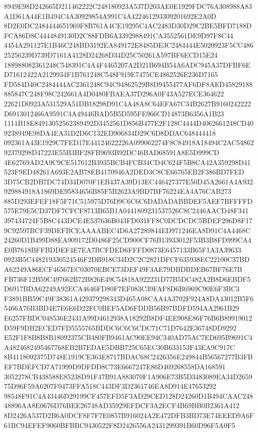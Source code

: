 \documentclass[UTF8,fontset=fandol,zihao=-4,a4paper]{ctexart}
\begin{document}
{{8949E98D242665D211462222C248180923A537D203AE0E1929FDC76A308988A83A1D61A44E1B494C4A30929854A991C4A422461293309201692E2A0D
8D2E0DC2484444651969F8B761A4CE19295C4AC2483D30D29C2BE5BFD7188DFCA86D8C4444849130D2C88FDB6A3392988491CA3552561DE9D97F8C44
4454A291127E1B46C248BD3192EA849172E8485DE3C2484444E5020923F5CC48625256239D739D7161A4128D24268D34D25C50261A597BF6ECD15E24
188988082361248C548391C4A4F4465207A2D21B694B54A6ADC945A37DFBF6ED71612422A2129934F1B761248C548F919E7475CE4862526E236D7165
FD584D40C2484444AC2361248C94C94862529B8D9455477AF6DF8AED45829188885847C248F98C242661A4D0480FBAEA37D296A0F43A527ECE364622
22621D0923A531529A51DB18298D91C4A48A8C64EFA67C34B2627B9160242222D6913012466A9591C4A49446BAD5B5D595FE966CD14873B6356A1B23
1111B18E84913052562389492D3452561D856B477E2F128C4444D4062661248CD409238949E98DA4EA31D2D6C132ED906834D29C6D8DDAC648444418
092361A43E1929C7FED17E44124622226A099062274F8C84918A18494C2AC5486292379298D47223E55B3BF28FB9693B92DC46BAD68591A8E5D999CD
4E62769AD2A9C9CE517612B3935BCB4FCB34CD4C624F5B8CA42A359298D41523F9ED48261A693E2AB78EB4170946A2DED3C8CE66765EB2F386BD7FED
3D75CB2DB7DC74D34D070F1EB437A39D13EC446427377E50D45A2661A4A932929884918A1869DE95834656B85F5B2623A9BD7BF76224EA4A76CAB273
885D293EFEF18F5F71C515975D76D9C6C6C6DADADABBDEF5AEF7BFFFFD575E79E5CD37DF7CFCF8713B65B1A0441809231537526C8C2446AACD48F341
397434724F5B8C443DCE4E537636B043FD031FF8C0DCDCDC5BDEF296D8F179C92597BCF39DEFBCEAAAABEC4D6A27289844ED971246EA8D91C4A4468C
24260D1B499D88EA909172D0486F25CD900CF76B13933012F53B3B8FD999CA4E0B7618BFFBDDEF4E7EA7BCFDED6FFFD0873E6457133B65F1A3A39633
0923B5C448219330524546F2DB918C34D2C2C2821DFCF635938EC22100C37BDA62249A86ECF46567EC03070EBCE73DEF49F3AE79DBDBDEB67BF76E7B
FB736F12B59C497662B72B826E49C54818A922231D77B5DC482A2B8D6EBDF5D6917BDA62249A92ECA4646FD80F7EF083C39FAF8D6B6969C90E6F3BC3
F3891BB59C49F38361A429379298343D465A08CAA4A3702F924A8DA43012B5F65466A76B3BD4E7E6E6D22FC0BEF5AD6FDDB56B97BDFD594AA2961B29
E6257FBDC048536E2431A99D4612938A18292B8DF4EE908E86F76B6B89919012D59F9DB2ECED7FD5555765BDDC6C6C6CDC71C71D7642E36748DD9292
E52F1F8B8B8B18092375CB480FB9461AC90EE94C340AD75AC7ED695B9691C4A4824682495467768EB2B7EDAE5DBB725C65EC30B633153F43EA9C917C
8B4118092375D748E1919CE363E8717BDAC68C2426356E249844B56567277B3FBEF7BDEFCD7A71999D9DFDD8C73E6667247E86D469268558DA168591
3052278CB438588E85238D91F47B91A883070F1A906E73B5D3483089EA34D265975D96F59A6207F0473FFA518C443DF3D2361746EA8D914E47653292
98548F91C4A43446D29199CF457EFD5F3AD29CED128D24260D1B494CAAC24848896AA8E0676D76BEE26748AD35929EFDCF3A2ECF4B69BB0B2361A412
8D2426A537D2B6A0DCF8F7F7E0857B916024A2E472DFB3BD73E74EEED9A6F61BC94EFEF9060BFBBC9430522F8D2426556A2431299391B60D96F5A0F5
}}
\end{document}
